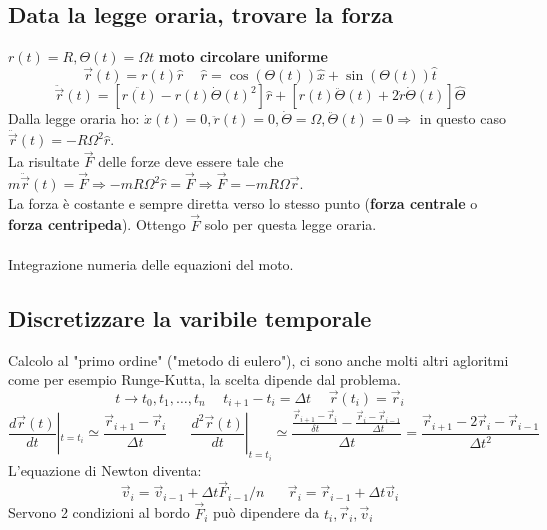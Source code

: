 \subsection{Data la legge oraria, trovare la forza}
$r(t) = R, \Theta(t) = \Omega t$ \textbf{moto circolare uniforme}
$$\vec{r}(t) = r(t)\hat{r}\hspace{15pt}\hat{r} = \cos(\Theta(t))\hat{x} + \sin(\Theta(t))\hat{t}$$
$$\ddot{\vec{r}} (t) = [\ddot{r(t)} - r(t)\dot{\Theta}(t)^2]\hat{r} + [r(t)\ddot{\Theta}(t) + 2\dot{r}\dot{\Theta}(t)]\hat{\Theta}$$
Dalla legge oraria ho: $\dot{x}(t) = 0, \ddot{r}(t) = 0, \dot{\Theta} = \Omega, \ddot{\Theta}(t) = 0 \Rightarrow$ in questo caso $\ddot{\vec{r}}(t) = -R\Omega^2\hat{r}$.\\
La risultate $\vec{F}$ delle forze deve essere tale che $m\ddot{\vec{r}}(t) = \vec{F} \Rightarrow -mR\Omega^2\hat{r} = \vec{F} \Rightarrow \vec{F} = -mR\Omega\vec{r}$.\\
La forza è costante e sempre diretta verso lo stesso punto (\textbf{forza centrale} o  \textbf{forza centripeda}). Ottengo $\vec{F}$ solo per questa legge oraria.\\\\
Integrazione numeria delle equazioni del moto.

\subsection{Discretizzare la varibile temporale}
Calcolo al "primo ordine" ("metodo di eulero"), ci sono anche molti altri agloritmi come per esempio Runge-Kutta, la scelta
dipende dal problema.
$$t \to t_0, t_1, \dots, t_n \hspace{15pt} t_{i+1} - t_i = \Delta t \hspace{15pt}\vec{r}(t_i) = \vec{r}_i$$
$$\frac{d\vec{r}(t)}{dt}|_{t=t_i} \simeq \frac{\vec{r}_{i+1} - \vec{r}_i}{\Delta t} \hspace{20pt}\frac{d^2\vec{r}(t)}{dt}|_{t = t_i} \simeq \frac{\frac{\vec{r}_{i+1} - \vec{r}_i}{\delta t} - \frac{\vec{r}_i - \vec{r}_{i-1}}{\Delta t}}{\Delta t} = \frac{\vec{r}_{i+1} - 2 \vec{r}_i - \vec{r}_{i-1}}{\Delta t^2}$$
L'equazione di Newton diventa:
$$\vec{v}_i = \vec{v}_{i-1} + \Delta t \vec{F}_{i-1} / n \hspace{20pt}\vec{r}_i = \vec{r}_{i-1} + \Delta t \vec{v}_i$$
Servono 2 condizioni al bordo $\vec{F}_i$ può dipendere da $t_i, \vec{r}_i, \vec{v}_i$

\newpage
